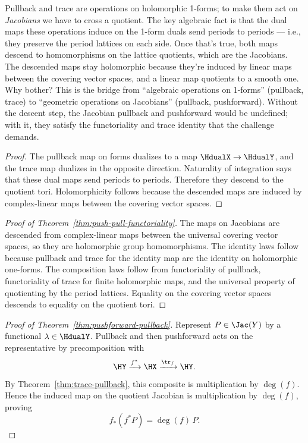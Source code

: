 \begin{layman}
Pullback and trace are operations on holomorphic 1-forms; to make them
act on \emph{Jacobians} we have to cross a quotient. The key algebraic
fact is that the dual maps these operations induce on the 1-form duals
send periods to periods --- i.e., they preserve the period lattices on
each side. Once that's true, both maps descend to homomorphisms
on the lattice quotients, which are the Jacobians. The descended maps
stay holomorphic because they're induced by linear maps between the
covering vector spaces, and a linear map quotients to a smooth one.
Why bother? This is the bridge from ``algebraic operations on 1-forms''
(pullback, trace) to ``geometric operations on Jacobians'' (pullback,
pushforward). Without the descent step, the Jacobian pullback and
pushforward would be undefined; with it, they satisfy the functoriality
and trace identity that the challenge demands.
\end{layman}

\begin{proof}\leanok
The pullback map on forms dualizes to a map \(\HdualX\to\HdualY\), and the
trace map dualizes in the opposite direction. Naturality of integration says
that these dual maps send periods to periods. Therefore they descend to the
quotient tori. Holomorphicity follows because the descended maps are induced
by complex-linear maps between the covering vector spaces.
\end{proof}

\begin{proof}[Proof of Theorem~\ref{thm:push-pull-functoriality}]\leanok
The maps on Jacobians are descended from complex-linear maps between the
universal covering vector spaces, so they are holomorphic group homomorphisms.
The identity laws follow because pullback and trace for the identity map are
the identity on holomorphic one-forms. The composition laws follow from
functoriality of pullback, functoriality of trace for finite holomorphic maps,
and the universal property of quotienting by the period lattices. Equality on
the covering vector spaces descends to equality on the quotient tori.
\end{proof}

\begin{proof}[Proof of Theorem~\ref{thm:pushforward-pullback}]\leanok
Represent \(P\in\Jac(Y)\) by a functional \(\lambda\in\HdualY\). Pullback and
then pushforward acts on the representative by precomposition with
\[
  \HY \xrightarrow{f^{*}} \HX \xrightarrow{\tr_f} \HY .
\]
By Theorem~\ref{thm:trace-pullback}, this composite is multiplication by
\(\deg(f)\). Hence the induced map on the quotient Jacobian is multiplication
by \(\deg(f)\), proving
\[
  f_*(f^{*}P)=\deg(f)\,P.
\]
\end{proof}

